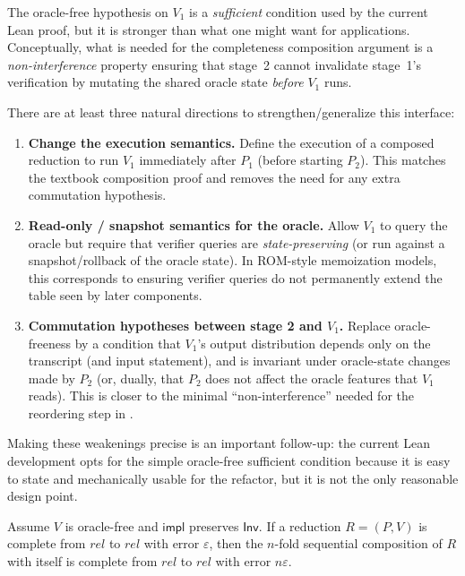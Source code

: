 \begin{remark}
\label{rem:oraclefree_strengthening}
The oracle-free hypothesis on $V_1$ is a \emph{sufficient} condition used by the current Lean proof,
but it is stronger than what one might want for applications. Conceptually, what is needed for the
completeness composition argument is a \emph{non-interference} property ensuring that stage~2 cannot
invalidate stage~1's verification by mutating the shared oracle state \emph{before} $V_1$ runs.

There are at least three natural directions to strengthen/generalize this interface:
\begin{enumerate}
  \item \textbf{Change the execution semantics.} Define the execution of a composed reduction to run
  $V_1$ immediately after $P_1$ (before starting $P_2$). This matches the textbook composition proof
  and removes the need for any extra commutation hypothesis.
  \item \textbf{Read-only / snapshot semantics for the oracle.} Allow $V_1$ to query the oracle but
  require that verifier queries are \emph{state-preserving} (or run against a snapshot/rollback of
  the oracle state). In ROM-style memoization models, this corresponds to ensuring verifier queries
  do not permanently extend the table seen by later components.
  \item \textbf{Commutation hypotheses between stage 2 and $V_1$.} Replace oracle-freeness by a
  condition that $V_1$'s output distribution depends only on the transcript (and input statement),
  and is invariant under oracle-state changes made by $P_2$ (or, dually, that $P_2$ does not affect
  the oracle features that $V_1$ reads). This is closer to the minimal ``non-interference'' needed
  for the reordering step in .
\end{enumerate}
Making these weakenings precise is an important follow-up: the current Lean development opts for the
simple oracle-free sufficient condition because it is easy to state and mechanically usable for the
refactor, but it is not the only reasonable design point.
\end{remark}

\begin{corollary}
\label{cor:completeness_comp_n}
Assume $V$ is oracle-free and $\mathsf{impl}$ preserves $\mathsf{Inv}$. If a reduction $R=(P,V)$ is
complete from $rel$ to $rel$ with error $\varepsilon$, then the $n$-fold sequential composition of
$R$ with itself is complete from $rel$ to $rel$ with error $n\varepsilon$.
\end{corollary}

